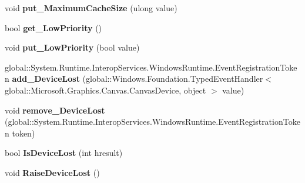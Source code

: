 \begin{DoxyCompactItemize}
\item 
\mbox{\label{class_microsoft_1_1_graphics_1_1_canvas_1_1_canvas_device_a87716d3ac1ed253fcee0a5e307d24b50}} 
void {\bfseries put\+\_\+\+Maximum\+Cache\+Size} (ulong value)
\item 
\mbox{\label{class_microsoft_1_1_graphics_1_1_canvas_1_1_canvas_device_a95f4876747bf8ac6c5fd2b67a83fed4f}} 
bool {\bfseries get\+\_\+\+Low\+Priority} ()
\item 
\mbox{\label{class_microsoft_1_1_graphics_1_1_canvas_1_1_canvas_device_ad1a2be7ca3c55a404a27d0e562278094}} 
void {\bfseries put\+\_\+\+Low\+Priority} (bool value)
\item 
\mbox{\label{class_microsoft_1_1_graphics_1_1_canvas_1_1_canvas_device_a631e1f27d9faf64d8b1ee234ffde2ed8}} 
global\+::\+System.\+Runtime.\+Interop\+Services.\+Windows\+Runtime.\+Event\+Registration\+Token {\bfseries add\+\_\+\+Device\+Lost} (global\+::\+Windows.\+Foundation.\+Typed\+Event\+Handler$<$ global\+::\+Microsoft.\+Graphics.\+Canvas.\+Canvas\+Device, object $>$ value)
\item 
\mbox{\label{class_microsoft_1_1_graphics_1_1_canvas_1_1_canvas_device_a4a4a0a58940cbe69bb830cd13b27e86c}} 
void {\bfseries remove\+\_\+\+Device\+Lost} (global\+::\+System.\+Runtime.\+Interop\+Services.\+Windows\+Runtime.\+Event\+Registration\+Token token)
\item 
\mbox{\label{class_microsoft_1_1_graphics_1_1_canvas_1_1_canvas_device_aa2c3386bb9c17effeb042c9f84c8037c}} 
bool {\bfseries Is\+Device\+Lost} (int hresult)
\item 
\mbox{\label{class_microsoft_1_1_graphics_1_1_canvas_1_1_canvas_device_a39809eaa6b66baebd35c08254533482e}} 
void {\bfseries Raise\+Device\+Lost} ()
\item 
\mbox{\label{class_microsoft_1_1_graphics_1_1_canvas_1_1_canvas_device_a4f5edc7899938d055a969c1fcb3a3404}} 

\end{DoxyCompactItemize}
